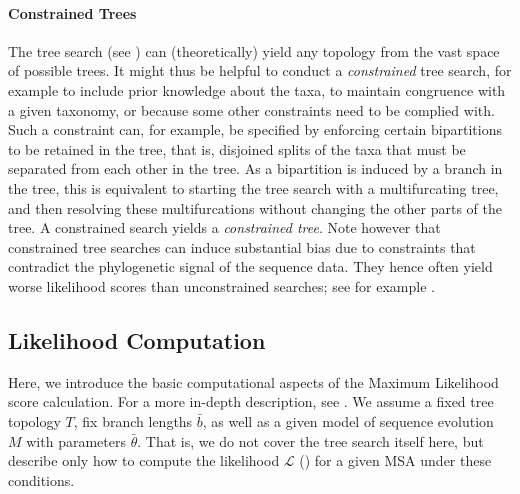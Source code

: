 \paragraph{Constrained Trees}
\label{ch:Foundations:sec:MLTreeInference:sub:FurtherAspects:par:ConstrainedTrees}

The tree search (see )
can (theoretically) yield any topology from the vast space of possible trees.
It might thus be helpful to conduct a \emph{constrained} tree search,
for example to include prior knowledge about the taxa,
to maintain congruence with a given taxonomy, or because some other constraints need to be complied with.
Such a constraint can, for example, be specified by enforcing certain bipartitions to be retained in the tree,
that is, disjoined splits of the taxa that must be separated from each other in the tree.
As a bipartition is induced by a branch in the tree,
this is equivalent to starting the tree search with a multifurcating tree,
and then resolving these multifurcations without changing the other parts of the tree.
A constrained search yields a \emph{constrained tree}.
Note however that constrained tree searches can induce substantial bias
due to constraints that contradict the phylogenetic signal of the sequence data.
They hence often yield worse likelihood scores than unconstrained searches;
see for example .



\subsection{Likelihood Computation}
\label{ch:Foundations:sec:MLTreeInference:sub:LikelihoodComputation}

Here, we introduce the basic computational aspects of the Maximum Likelihood score calculation.
For a more in-depth description, see .
We assume a fixed tree topology $T$, fix branch lengths $\bar{b}$,
as well as a given model of sequence evolution $M$ with parameters $\bar{\theta}$.
That is, we do not cover the tree search itself here,
but describe only how to compute the likelihood $\mathcal{L}$
() for a given MSA under these conditions.

